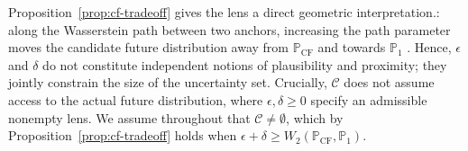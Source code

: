 Proposition~\ref{prop:cf-tradeoff} gives the lens a direct geometric interpretation.: along the Wasserstein path between two anchors, increasing the path parameter moves the candidate future distribution away from $\mathbb{P}_{\mathrm{CF}}$ and towards $\mathbb{P}_{1}$ . 
Hence, $\epsilon$ and $\delta$ do not constitute independent notions of plausibility and proximity; they jointly constrain the size of the uncertainty set.
Crucially, $\mathcal C$ does not assume access to the actual future distribution, where $\epsilon,\delta\ge0$ specify an admissible nonempty lens.
We assume throughout that $\mathcal{C}\neq\emptyset$, which by Proposition~\ref{prop:cf-tradeoff} holds when
$\epsilon+\delta\ge
W_2(\mathbb{P}_{\mathrm{CF}},\mathbb{P}_1)$.

